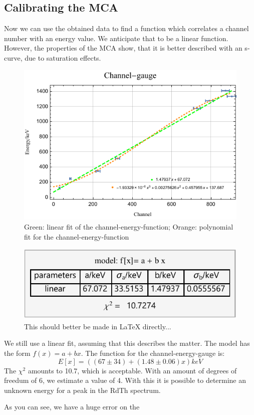 \documentclass[10pt,a4paper]{article}
\begin{document}
\subsection*{Calibrating the MCA}
Now we can use the obtained data to find a function which correlates a channel number with an energy value. We anticipate that to be a linear function. However, the properties of the MCA show, that it is better described with an s-curve, due to saturation effects. 
\begin{figure}[hbtp]
\centering
\includegraphics[scale=1.8]{Channelgauge.pdf}
\caption{Green: linear fit of the channel-energy-function; Orange: polynomial fit for the channel-energy-function}
\end{figure}
\begin{figure}[hbtp]
\centering
\includegraphics[scale=1]{result.pdf}
\caption{This should better be made in LaTeX directly...}
\end{figure}
We still use a linear fit, assuming that this describes the matter. The model has the form $f(x) = a + b x$. The function for the channel-energy-gauge is:
\[E[x] = ((67 \pm 34) + (1.48 \pm 0.06) x )keV\]
The $\chi^{2}$ amounts to 10.7, which is acceptable. With an amount of degrees of freedum of 6, we estimate a value of 4. With this it is possible to determine an unknown energy for a peak in the RdTh spectrum. 

As you can see, we have a huge error on the 
\end{document}
